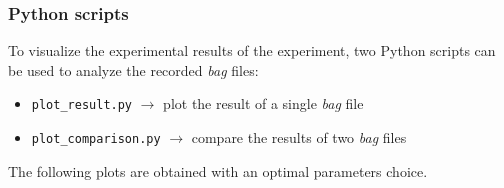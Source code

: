 \documentclass{beamer}
\begin{document}
\begin{frame}
\frametitle{Python scripts}

To visualize the experimental results of the experiment, two Python scripts can
be used to analyze the recorded \textit{bag} files:
\begin{itemize}
  \item \texttt{plot\_result.py} $\rightarrow$ plot the result of a single \textit{bag} file
  \item \texttt{plot\_comparison.py} $\rightarrow$ compare the results of two \textit{bag} files
\end{itemize}

\vspace{2em}

The following plots are obtained with an optimal parameters choice.

\end{frame}

\end{document}
